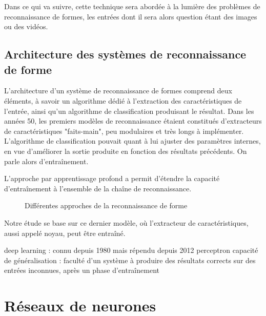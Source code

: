 \documentclass[a4paper,10pt]{report}
\begin{document}
Dans ce qui va suivre, cette technique sera abordée à la lumière des problèmes de reconnaissance de formes, les entrées dont il sera alors question étant des images ou des vidéos.

\subsection{Architecture des systèmes de reconnaissance de forme}

L'architecture d'un système de reconnaissance de formes comprend deux éléments, à savoir un algorithme dédié à l'extraction des caractéristiques de l'entrée, ainsi qu'un algorithme de classification produisant le résultat.
Dans les années 50, les premiers modèles de reconnaissance étaient constitués d'extracteurs de caractéristiques "faits-main", peu modulaires et très longs à implémenter.
L'algorithme de classification pouvait quant à lui ajuster des paramètres internes, en vue d'améliorer la sortie produite en fonction des résultats précédents. On parle alors d'entraînement.

L'approche par apprentissage profond a permit d'étendre la capacité d'entraînement à l'ensemble de la chaîne de reconnaissance.

\begin{figure}
    \centering
    \makebox[\textwidth]{}
    \caption{Différentes approches de la reconnaissance de forme}
    \label{fig:Fig1}
\end{figure}

Notre étude se base sur ce dernier modèle, où l'extracteur de caractéristiques, aussi appelé noyau, peut être entraîné.

deep learning : connu depuis 1980 mais répendu depuis 2012
perceptron
capacité de généralisation : faculté d'un système à produire des résultats corrects sur des entrées inconnues, après un phase d'entraînement



\section{Réseaux de neurones}
\end{document}
